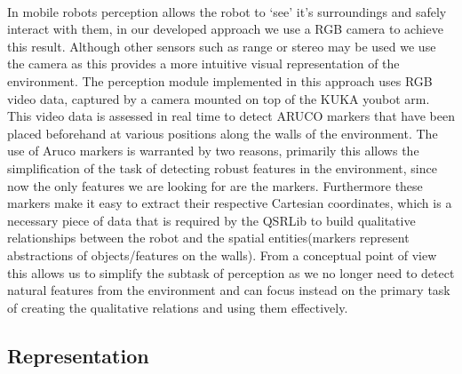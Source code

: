 \paragraph{}In mobile robots perception allows the robot to `see' it's surroundings and safely interact with them, in our developed approach we use a RGB camera to achieve this result. Although other sensors such as range or stereo may be used we use the camera as this provides a more intuitive visual representation of the environment. The perception module implemented in this approach uses RGB video data, captured by a camera mounted on top of the KUKA youbot arm. This video data is assessed in real time to detect ARUCO markers that have been placed beforehand at various positions along the walls of the environment. The use of Aruco markers is warranted by two reasons, primarily this allows the simplification of the task of detecting robust features in the environment, since now the only features we are looking for are the markers. Furthermore these markers make it easy to extract their respective Cartesian coordinates, which is a necessary piece of data that is required by the QSRLib to build qualitative relationships between the robot and the spatial entities(markers represent abstractions of objects/features on the walls). From a conceptual point of view this allows us to simplify the subtask of perception as we no longer need to detect natural features from the environment and can focus instead on the primary task of creating the qualitative relations and using them effectively.

\subsection{Representation}
